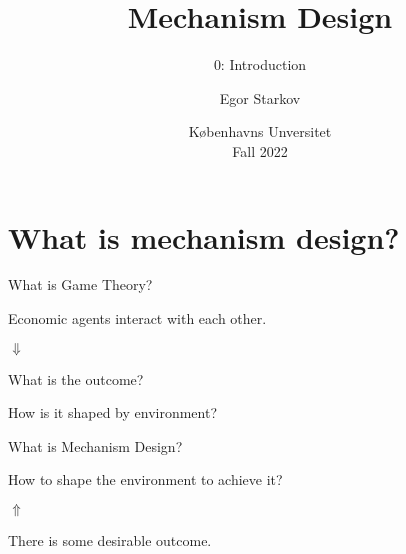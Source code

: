 \documentclass[english,10pt
,aspectratio=169
]{beamer}
\title{Mechanism Design}
\subtitle{0: Introduction}
\author{Egor Starkov}
\date{K{\o}benhavns Unversitet \\
	Fall 2022}
\begin{document}
	\frame[plain]{\titlepage}


\section{What is mechanism design?}

\begin{frame}{What is Game Theory?}
\begin{center}
	Economic agents interact with each other.
	\pause
	
	$\Downarrow$
	
	What is the outcome? 
	
	How is it shaped by environment?
\end{center}
\end{frame}


\begin{frame}{What is Mechanism Design?}
\begin{center}
	\pause[2] 
	How to shape the environment to achieve it?
	
	$\Uparrow$
	
	\pause[1]
	There is some desirable outcome.
\end{center}
\end{frame}


\end{document}
